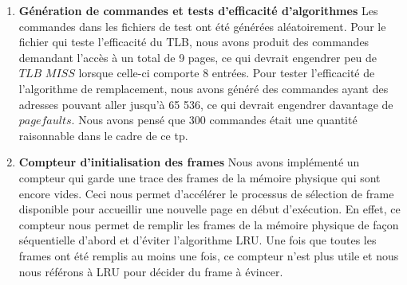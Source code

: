 \documentclass[12pt]{article}
\begin{document}
\begin{enumerate}
\item \textbf{Génération de commandes et tests d'efficacité d'algorithmes}
Les commandes dans les fichiers de test ont été générées aléatoirement. Pour le fichier qui teste l'efficacité du TLB, nous avons produit des commandes demandant l'accès à un total de 9 pages, ce qui devrait engendrer peu de $TLB$ $MISS$ lorsque celle-ci comporte 8 entrées. Pour tester l'efficacité de l'algorithme de remplacement, nous avons généré des commandes ayant des adresses pouvant aller jusqu'à 65 536, ce qui devrait engendrer davantage de $page faults$. Nous avons pensé que 300 commandes était une quantité raisonnable dans le cadre de ce tp.

\item \textbf{Compteur d'initialisation des frames}
\newline
Nous avons implémenté un compteur qui garde une trace des frames de la mémoire physique qui sont encore vides. Ceci nous permet d'accélérer le processus de sélection de frame disponible pour accueillir une nouvelle page en début d'exécution. En effet, ce compteur nous permet de remplir les frames de la mémoire physique de façon séquentielle d'abord et d'éviter l'algorithme LRU. Une fois que toutes les frames ont été remplis au moins une fois, ce compteur n'est plus utile et nous nous référons à LRU pour décider du frame à évincer. 
\end{enumerate}
\end{document}
